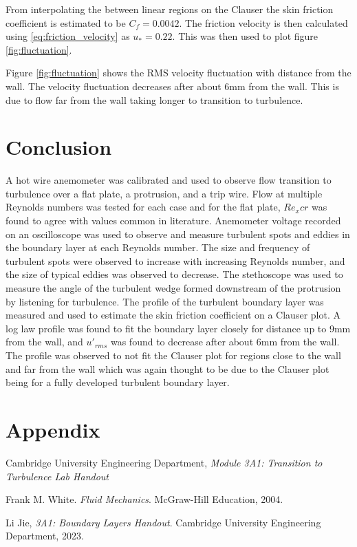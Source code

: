 \documentclass{article}
\begin{document}
From interpolating the between linear regions on the Clauser the skin friction coefficient is estimated to be $C_f = 0.0042$.
The friction velocity is then calculated using \ref{eq:friction_velocity} as $u_* = 0.22$.
This was then used to plot figure \ref{fig:fluctuation}.


Figure \ref{fig:fluctuation} shows the RMS velocity fluctuation with distance from the wall.
The velocity fluctuation decreases after about 6mm from the wall.
This is due to flow far from the wall taking longer to transition to turbulence.

\newpage

\section{Conclusion}

A hot wire anemometer was calibrated and used to observe flow transition to turbulence over a flat plate, a protrusion, and a trip wire.
Flow at multiple Reynolds numbers was tested for each case and for the flat plate, $Re_xcr$ was found to agree with values common in literature.
Anemometer voltage recorded on an oscilloscope was used to observe and measure turbulent spots and eddies in the boundary layer at each Reynolds number.
The size and frequency of turbulent spots were observed to increase with increasing Reynolds number, and the size of typical eddies was observed to decrease.
The stethoscope was used to measure the angle of the turbulent wedge formed downstream of the protrusion by listening for turbulence.
The profile of the turbulent boundary layer was measured and used to estimate the skin friction coefficient on a Clauser plot.
A log law profile was found to fit the boundary layer closely for distance up to 9mm from the wall, and
$u'_{rms}$ was found to decrease after about 6mm from the wall.
The profile was observed to not fit the Clauser plot for regions close to the wall and far from the wall which was again thought to be due
to the Clauser plot being for a fully developed turbulent boundary layer.



\section{Appendix}

\begin{thebibliography}{9}
    Cambridge University Engineering Department, \textit{Module 3A1: Transition to Turbulence Lab Handout}

    Frank M. White. \textit{Fluid Mechanics}. McGraw-Hill Education, 2004.

    Li Jie, \textit{3A1: Boundary Layers Handout}. Cambridge University Engineering Department, 2023.
\end{thebibliography}
\end{document}
